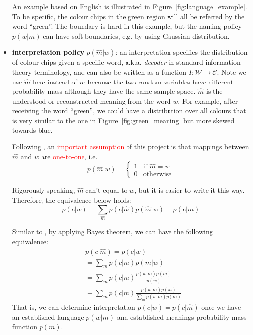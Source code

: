 \documentclass[11pt]{article}
\begin{document}
\begin{itemize}[leftmargin=*]
    An example based on English is illustrated in Figure~\ref{fig:language_example}.
    To be specific, the colour chips in the green region will all be referred by the word ``green''.
    The boundary is hard in this example, but the naming policy $p(w|m)$ can have soft boundaries, e.g. by using Gaussian distribution.
    
    \item \textbf{interpretation policy $p(\hat{m}|w)$\label{par:decoder}}: an interpretation specifies the distribution of colour chips given a specific word, a.k.a. \emph{decoder} in standard information theory terminology, and can also be written as a function $I:\mathcal{W}\rightarrow\mathcal{C}$.
    Note we use $\hat{m}$ here instead of $m$ because the two random variables have different probability mass although they have the same sample space. 
    $\hat{m}$ is the understood or reconstructed meaning from the word $w$.
    For example, after receiving the word ``green'', we could have a distribution over all colours that is very similar to the one in Figure~\ref{fig:green_meaning} but more skewed towards blue.
    
    Following \citet{zaslavsky2018efficient}, an \textcolor{red}{important assumption} of this project is that mappings between $\hat{m}$ and $w$ are \textcolor{red}{one-to-one}, i.e.
    \begin{equation}
        p(\hat{m}|w) =
        \begin{cases}
            1 & \text{if $\hat{m}=w$}\\
            0 & \text{otherwise}
        \end{cases} 
        \label{eq:bijective_mhat_w}
    \end{equation}
    
    Rigorously speaking, $\hat{m}$ can't equal to $w$, but it is easier to write it this way. Therefore, the equivalence below holds:
    \begin{equation}
        p(c|w)  = \sum_{\hat{m}} p(c|\hat{m})p(\hat{m}|w)  = p(c|\hat{m})
        \label{eq:p_mhat_and_m}
    \end{equation}
    
    Similar to \citep{zaslavsky2018efficient}, by applying Bayes theorem, we can have the following equivalence:
    \begin{equation}
        \begin{split}
            & p(c|\hat{m}) = p(c|w) \\
            & = \sum_m p(c|m)p(m|w) \\
            & = \sum_m p(c|m) \frac{p(w|m)p(m)}{p(w)} \\
            & = \sum_m p(c|m) \frac{p(w|m)p(m)}{\sum_m p(w|m)p(m)}
        \end{split}
        \label{eq:bayesian_interpretation}
    \end{equation}
    That is, we can determine interpretation $p(c|w) = p(c|\hat{m})$ once we have an established language $p(w|m)$ and established meanings probability mass function $p(m)$.
\end{itemize}
\end{document}
